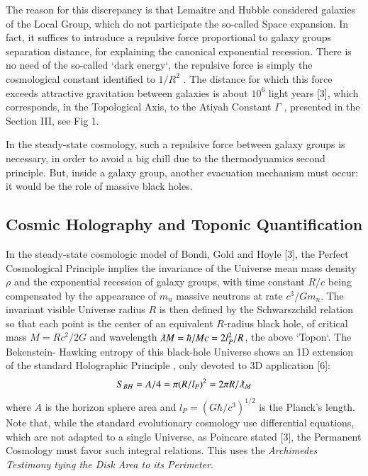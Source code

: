 \documentclass[twoside,draft]{article}
\begin{document}
\begin{sloppypar}
{The reason for this discrepancy is that Lemaitre and Hubble considered galaxies of the Local
Group, which do not participate the so-called Space expansion. In fact, it suffices to introduce a
repulsive force proportional to galaxy groups separation distance, for explaining the canonical
exponential recession. There is no need of the so-called `dark energy`, the repulsive force is simply
the cosmological constant identified to $1/R^{2}$ . The distance for which this force exceeds attractive
gravitation between galaxies is about $10^{6}$ light years \cite{fm1}[3], which corresponds, in the Topological
Axis, to the Atiyah Constant $\Gamma$ , presented in the Section III, see Fig 1.

In the steady-state cosmology, such a repulsive force between galaxy groups is necessary, in
order to avoid a big chill due to the thermodynamics second principle. But, inside a galaxy group,
another evacuation mechanism must occur: it would be the role of massive black holes.



\subsection{Cosmic Holography and Toponic Quantification}

In the steady-state cosmologic model of Bondi, Gold and Hoyle [3], the Perfect Cosmological
Principle implies the invariance of the Universe mean mass density $\rho$ and the exponential recession
of galaxy groups, with time constant $R/c$ being compensated by the appearance of $m_n$ massive
neutrons at rate $c^{3} /Gm_{n}$. The invariant visible Universe radius $R$ is then defined by the
Schwarszchild relation so that each point is the center of an equivalent $R$-radius black hole, of
critical mass $M = Rc^{2} /2G$ and wavelength $\lambdabar M = \hbar/Mc = 2l_{P}^{2} /R$, the above `Topon`. The Bekenstein-
Hawking entropy of this black-hole Universe shows an 1D extension of the standard Holographic
Principle , only devoted to 3D application [6]:
\begin{equation}
S_{BH} = A/4 = \pi(R/l_{P})^{2} = 2\pi R/\lambdabar_{M}
\end{equation}
where $A$ is the horizon sphere area and $l_{P} = (G\hbar/c^{3} )^{1/2}$ is the Planck's length. Note that, while the standard evolutionary cosmology use differential equations, which are not adapted to a single Universe, as Poincare stated [3],  the Permanent Cosmology must favor such integral relations. This
uses the \textit{Archimedes Testimony tying the Disk Area to its Perimeter}.

}
\end{sloppypar}
\end{document}

